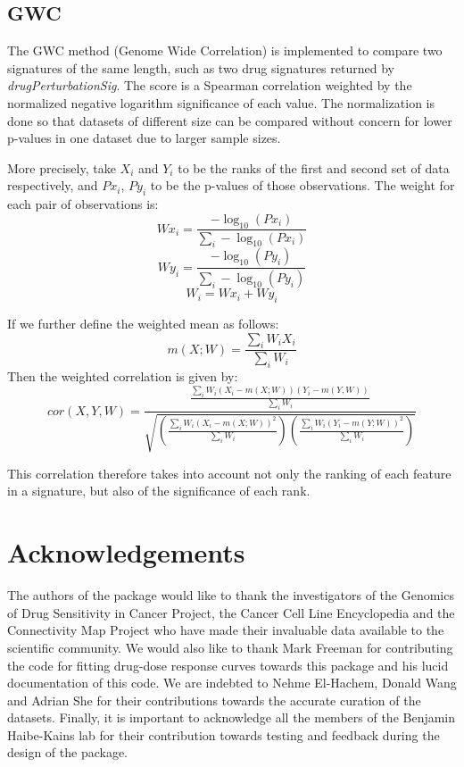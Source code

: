 \documentclass[11pt]{article}
\begin{document}
\subsection{GWC}

The GWC method (Genome Wide Correlation) is implemented to compare two signatures of the same length, such as two drug signatures returned by \textit{drugPerturbationSig}. The score is a Spearman correlation weighted by the normalized negative logarithm significance of each value. The normalization is done so that datasets of different size can be compared without concern for lower p-values in one dataset due to larger sample sizes. 

More precisely, take $X_i$ and $Y_i$ to be the ranks of the first and second set of data respectively, and $Px_i$, $Py_i$ to be the p-values of those observations. The weight for each pair of observations is:
$$Wx_i = \frac{-\log_{10}(Px_i)}{\sum_{i}-\log_{10}(Px_i)}$$
$$Wy_i = \frac{-\log_{10}(Py_i)}{\sum_{i}-\log_{10}(Py_i)}$$
$$W_i = Wx_i + Wy_i$$

If we further define the weighted mean as follows:
$$ m(X;W) = \frac{\sum_i W_i X_i}{\sum_i{W_i}}$$
Then the weighted correlation is given by:
$$ cor(X,Y,W) = \frac{\frac{\sum_i W_i (X_i - m(X;W))(Y_i - m(Y,W))}{\sum_i W_i}}{\sqrt{(\frac{\sum_i W_i (X_i - m(X;W))^2}{\sum_i W_i})(\frac{\sum_i W_i (Y_i - m(Y;W))^2}{\sum_i W_i})}}$$

This correlation therefore takes into account not only the ranking of each feature in a signature, but also of the significance of each rank.

\section{Acknowledgements}
The authors of the package would like to thank the investigators of the Genomics of Drug Sensitivity in Cancer Project, the Cancer Cell Line Encyclopedia and the Connectivity Map Project who have made their invaluable data available to the scientific community. We would also like to thank Mark Freeman for contributing the code for fitting drug-dose response curves towards this package and his lucid documentation of this code. We are indebted to Nehme El-Hachem, Donald Wang and Adrian She for their contributions towards the accurate curation of the datasets. Finally, it is important to acknowledge all the members of the Benjamin Haibe-Kains lab for their contribution towards testing and feedback during the design of the package.\\
\end{document}
